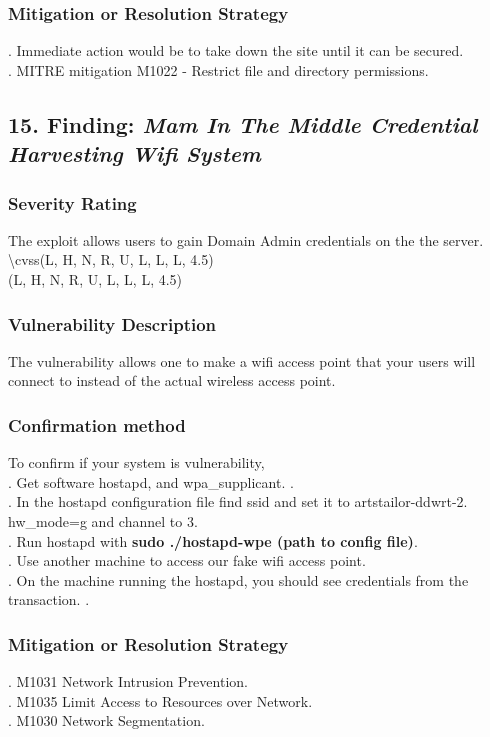 \documentclass[notitlepage]{article}
\begin{document}
	\subsubsection{Mitigation or Resolution Strategy}
	. Immediate action would be to take down the site until it can be secured. \\
	. MITRE mitigation M1022 - Restrict file and directory permissions. \\
	
		
	\subsection{15. Finding: \emph{Mam In The Middle Credential Harvesting Wifi System}}
	
	\subsubsection{Severity Rating}
	\indent The exploit allows users to gain Domain Admin credentials on the the server. 
	\textbackslash cvss(L, H, N, R, U, L, L, L, 4.5)\\
	\cvss(L, H, N, R, U, L, L, L, 4.5) \\
	
	\subsubsection{Vulnerability Description}
	\indent The vulnerability allows one to make a wifi access point that your users will connect to instead of the actual wireless access point.  \\
	
	\subsubsection{Confirmation method}
	To confirm if your system is vulnerability, \\
	. Get software hostapd, and wpa\_supplicant.  .\\
	. In the hostapd configuration file find ssid and set it to artstailor-ddwrt-2. hw\_mode=g and channel to 3.\\
	. Run hostapd with \textbf{sudo ./hostapd-wpe (path to config file)}.\\
	. Use another machine to access our fake wifi access point. \\
	. On the machine running the hostapd, you should see credentials from the transaction. . \\
	
	\subsubsection{Mitigation or Resolution Strategy}
	. M1031 Network Intrusion Prevention. \\
	. M1035 Limit Access to Resources over Network. \\  
	. M1030 Network Segmentation. \\
	
	
\end{document}

